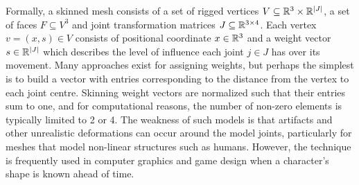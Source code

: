 
Formally, a skinned mesh consists of a set of rigged vertices $V \subseteq {\mathbb{R}^{3}} \times {\mathbb{R}^{|J|}}$, a set of faces $F \subseteq V^3$ and joint transformation matrices $J \subseteq {\mathbb{R}^{3 \times 4}}$. Each vertex $v = (x, s) \in V$ consists of positional coordinate $x \in {\mathbb{R}^{3}}$ and a weight vector $s \in {\mathbb{R}^{|J|}}$ which describes the level of influence each joint $j \in J$ has over its movement. Many approaches exist for assigning weights, but perhaps the simplest is to build a vector with entries corresponding to the distance from the vertex to each joint centre. Skinning weight vectors are normalized such that their entries sum to one, and for computational reasons, the number of non-zero elements is typically limited to 2 or 4. The weakness of such models is that artifacts and other unrealistic deformations can occur around the model joints, particularly for meshes that model non-linear structures such as humans. However, the technique is frequently used in computer graphics and game design when a character's shape is known ahead of time.


